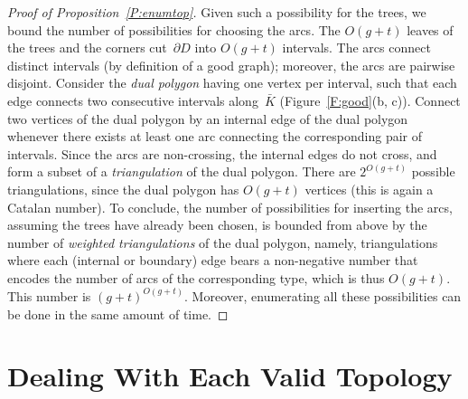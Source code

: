 \documentclass[11pt]{article}
\newcommand{\KK}{\ensuremath{\bar{K}}}
\theoremstyle{plain}  \newtheorem{theorem}{Theorem}[section]
\theoremstyle{definition}
\begin{document}
\begin{proof}[Proof of Proposition~\ref{P:enumtop}]
  Given such a possibility for the trees, we bound the number of
  possibilities for choosing the arcs.  The $O(g+t)$ leaves of the trees
  and the corners cut~$\partial D$ into $O(g+t)$ intervals.  The arcs
  connect distinct intervals (by definition of a good graph); moreover, the
  arcs are pairwise disjoint.  Consider the \emph{dual polygon} having one
  vertex per interval, such that each edge connects two consecutive
  intervals along~$\KK$ (Figure~\ref{F:good}(b, c)).  Connect two vertices
  of the dual polygon by an internal edge of the dual polygon whenever
  there exists at least one arc connecting the corresponding pair of
  intervals.  Since the arcs are non-crossing, the internal edges do not
  cross, and form a subset of a \emph{triangulation} of the dual polygon.
  There are $2^{O(g+t)}$ possible triangulations, since the dual polygon
  has $O(g+t)$ vertices (this is again a Catalan number).  To conclude, the
  number of possibilities for inserting the arcs, assuming the trees have
  already been chosen, is bounded from above by the number of
  \emph{weighted triangulations} of the dual polygon, namely,
  triangulations where each (internal or boundary) edge bears a
  non-negative number that encodes the number of arcs of the corresponding
  type, which is thus $O(g+t)$.  This number is $(g+t)^{O(g+t)}$.
  Moreover, enumerating all these possibilities can be done in the same
  amount of time.
\end{proof}

\section{Dealing With Each Valid Topology}\label{S:final}
\end{document}
